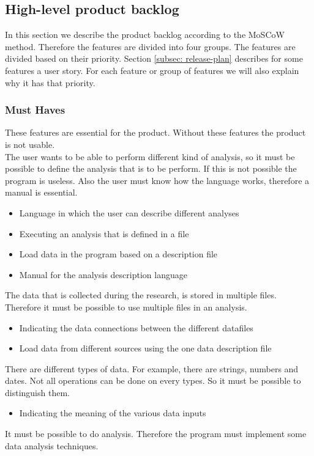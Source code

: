 \subsection{High-level product backlog}
\label{subsec: MoSCoW}
In this section we describe the product backlog according to the MoSCoW method. Therefore the features are divided into four groups. The features are divided based on their priority. Section \ref{subsec: release-plan} describes for some features a user story. For each feature or group of features we will also explain why it has that priority.
\subsubsection{Must Haves}
These features are essential for the product. Without these features the product is not usable. \\
The user wants to be able to perform different kind of analysis, so it must be possible to define the analysis that is to be perform. If this is not possible the program is useless. Also the user must know how the language works, therefore a manual is essential.
\begin{itemize}
  \item Language in which the user can describe different analyses
  \item Executing an analysis that is defined in a file
  \item Load data in the program based on a description file
  \item Manual for the analysis description language
\end{itemize}
The data that is collected during the research, is stored in multiple files. Therefore it must be possible to use multiple files in an analysis.
\begin{itemize}
  \item Indicating the data connections between the different datafiles
  \item Load data from different sources using the one data description file
\end{itemize}
There are different types of data. For example, there are strings, numbers and dates. Not all operations can be done on every types. So it must be possible to distinguish them.
\begin{itemize}
  \item Indicating the meaning of the various data inputs
\end{itemize}
It must be possible to do analysis. Therefore the program must implement some data analysis techniques.
